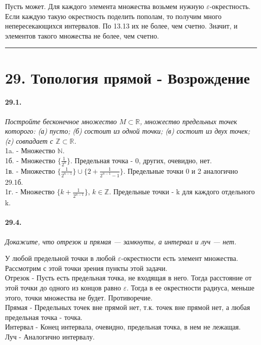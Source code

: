 \documentclass{book}
\begin{document}
Пусть может. Для каждого элемента множества возьмем нужную $\varepsilon$-окрестность. Если каждую такую окрестность поделить пополам, то получим много непересекающихся интервалов. По 13.13 их не более, чем счетно. Значит, и элементов такого множества не более, чем счетно.

\medskip \hrule \medskip

\section*{29. Топология прямой - Возрождение}


\paragraph{29.1.}
\textit{Постройте бесконечное множество $M \subset \mathbb{R}$, множество предельных точек которого: (а) пусто; (б) состоит из одной точки; (в) состоит из двух точек; (г) совпадает с $\mathbb{Z} \subset  \mathbb{R}$.} \\
1a. -  Множество $\mathbb{N}$. \\
	1б. - Множество $\{\frac{1}{2^n}\}$. Предельная точка - 0, других, очевидно, нет. \\
	1в. - Множество $\{\frac{1}{2^{n-1}}\} \cup  \{2 + \frac{1}{2^{n-1}-1}\}$. Предельные точки 0 и 2 аналогично 29.1б. \\
	1г. -  Множество $\{k + \frac{1}{2^{n-1}}\}$, $k \in \mathbb{Z}$. Предельные точки - k для каждого отдельного k.
	
\paragraph{29.4.}
\textit{Докажите, что отрезок и прямая — замкнуты, а интервал и луч — нет.}

У любой предельной точки в любой $\varepsilon$-окрестности есть элемент множества. Рассмотрим с этой точки зрения пункты этой задачи. \\
Отрезок - Пусть есть предельная точка, не входящая в него. Тогда расстояние от этой точки до одного из концов равно $\varepsilon$. Тогда в ее окрестности радиуса, меньше этого, точки множества не будет. Противоречие.\\
Прямая - Предельных точек вне прямой нет, т.к. точек вне прямой нет, а любая предельная точка - точка.\\
Интервал - Конец интервала, очевидно, предельная точка, в нем не лежащая. \\
Луч - Аналогично интервалу. 
\end{document}
